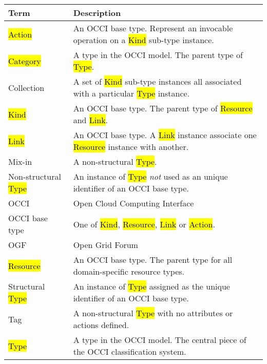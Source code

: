 \begin{tabular}{l|p{11cm}}
Term & Description \\
\hline
\hl{Action} & An OCCI base type. Represent an invocable operation on a \hl{Kind} sub-type instance. \\
\hl{Category} & A type in the OCCI model. The parent type of \hl{Type}. \\
Collection & A set of \hl{Kind} sub-type instances all associated with a particular \hl{Type} instance. \\
\hl{Kind} & An OCCI base type. The parent type of \hl{Resource} and \hl{Link}. \\
\hl{Link} & An OCCI base type. A \hl{Link} instance associate one \hl{Resource} instance with another. \\
Mix-in & A non-structural \hl{Type}. \\
Non-structural \hl{Type} & An instance of \hl{Type} {\em not} used as an unique identifier of an OCCI base type. \\
OCCI & Open Cloud Computing Interface \\
OCCI base type & One of \hl{Kind}, \hl{Resource}, \hl{Link} or \hl{Action}. \\
OGF & Open Grid Forum \\
\hl{Resource} & An OCCI base type. The parent type for all domain-specific resource types. \\
Structural \hl{Type} & An instance of \hl{Type} assigned as the unique identifier of an OCCI base type. \\
Tag & A non-structural \hl{Type} with no attributes or actions defined. \\
\hl{Type} & A type in the OCCI model. The central piece of the OCCI classification system. \\
\end{tabular}
